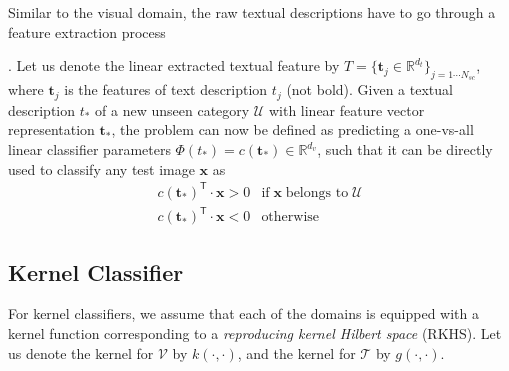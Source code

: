  Similar to the visual domain, the raw textual descriptions have to go through a feature extraction process. Let us denote the linear extracted textual feature by 
$T=\{\mathbf{t}_j \in \mathbb{R}^{d_t}\}_{j=1\cdots N_{sc}}$, where $\mathbf{t}_j$ is the features of text description $t_j$ (not bold).  Given a textual description ${t}_*$  of a new unseen category $\mathcal{U}$  with linear feature vector representation $\mathbf{t}_*$, the problem can now be defined as predicting a one-vs-all linear classifier parameters ${\Phi}{(t_*)} = c(\mathbf{t}_*) \in \mathbb{R}^{d_v}$,  such that it can be directly used to classify any test image $\mathbf{x}$ as 
\begin{eqnarray}
      c(\mathbf{t}_*)^\textsf{T} \cdot \mathbf{x} >  0 & \text{if} \;  \mathbf{x} \; \text{belongs to} \;\mathcal{U} \nonumber \\
      c(\mathbf{t}_*)^\textsf{T} \cdot \mathbf{x} <  0 &  \text{otherwise} \label{E:PredictedClass}
\end{eqnarray}


\subsection{Kernel Classifier}
\label{sec_kernel_pdef}
For kernel classifiers, we assume that each of the domains is equipped with a kernel function corresponding to a \textit{reproducing kernel Hilbert space} (RKHS). Let us denote the kernel for $\mathcal{V}$ by $k(\cdot,\cdot)$, and the kernel for $\mathcal{T}$ by $g(\cdot,\cdot)$. %
\normalsize 

